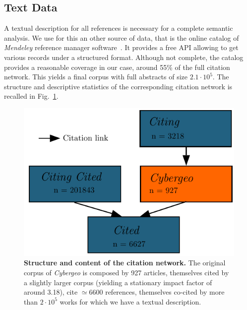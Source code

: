 \subsection*{Text Data}

A textual description for all references is necessary for a complete semantic analysis. We use for this an other source of data, that is the online catalog of \textit{Mendeley} reference manager software~\cite{mendeley}. It provides a free API allowing to get various records under a structured format. Although not complete, the catalog provides a reasonable coverage in our case, around 55\% of the full citation network. This yields a final corpus with full abstracts of size $2.1\cdot 10^5$. The structure and descriptive statistics of the corresponding citation network is recalled in Fig.~\ref{fig:citationnetwork}.





\begin{figure}
\centering
\includegraphics[width=\textwidth]{figures/Fig2.pdf}
\caption{\textbf{Structure and content of the citation network.} The original corpus of \emph{Cybergeo} is composed by 927 articles, themselves cited by a slightly larger corpus (yielding a stationary impact factor of around 3.18), cite $\simeq 6600$ references, themselves co-cited by more than $2\cdot 10^5$ works for which we have a textual description.}
\label{fig:citationnetwork}
\end{figure}









